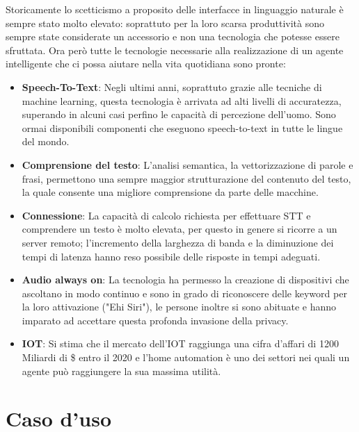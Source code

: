 \documentclass[twoside]{supsistudent}
\begin{document}
Storicamente lo scetticismo a proposito delle interfacce in linguaggio naturale è sempre stato molto elevato: soprattuto per la loro scarsa produttività sono sempre state considerate un accessorio e non una tecnologia che potesse essere sfruttata.
Ora però tutte le tecnologie necessarie alla realizzazione di un agente intelligente che ci possa aiutare nella vita quotidiana sono pronte:
\begin{itemize}
  \item \textbf{Speech-To-Text}: Negli ultimi anni, soprattuto grazie alle tecniche di machine learning, questa tecnologia è arrivata ad alti livelli di accuratezza, superando in alcuni casi perfino le capacità di percezione dell'uomo. Sono ormai disponibili componenti che eseguono speech-to-text in tutte le lingue del mondo.\cite{sttmachinelearning}
   \item \textbf{Comprensione del testo}: L'analisi semantica, la vettorizzazione di parole e frasi, permettono una sempre maggior strutturazione del contenuto del testo, la quale consente una migliore comprensione da parte delle macchine.\cite{word2vec}
    \item \textbf{Connessione}: La capacità di calcolo richiesta per effettuare STT e comprendere un testo è molto elevata, per questo in genere si ricorre a un server remoto; l'incremento della larghezza di banda e la diminuzione dei tempi di latenza hanno reso possibile delle risposte in tempi adeguati.
     \item \textbf{Audio always on}: La tecnologia ha permesso la creazione di dispositivi che ascoltano in modo continuo e sono in grado di riconoscere delle keyword per la loro attivazione ("Ehi Siri"), le persone inoltre si sono abituate e hanno imparato ad accettare questa profonda invasione della privacy.
     \item \textbf{IOT}: Si stima che il mercato dell'IOT raggiunga una cifra d'affari di 1200 Miliardi di \$ entro il 2020 e l'home automation è uno dei settori nei quali un agente può raggiungere la sua massima utilità. 
\end{itemize}

\chapter{Caso d'uso}
\end{document}
